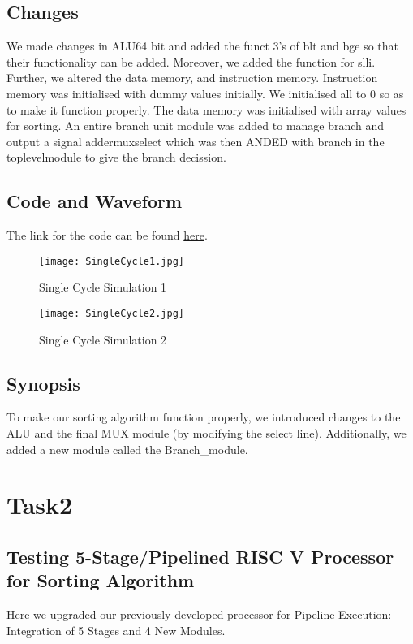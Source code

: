 \documentclass{report}
\begin{document}
\subsection{Changes}
    We made changes in ALU64 bit and added the funct 3's of blt and bge so that their functionality can be added. Moreover, we added the function for slli. Further, we altered the data memory, and instruction memory. Instruction memory was initialised with dummy values initially. We initialised all to 0 so as to make it function properly. The data memory was initialised with array values for sorting. An entire branch unit module was added to manage branch and output a signal addermuxselect which was then ANDED with branch in the toplevelmodule to give the branch decission.
    \pagebreak
\subsection{Code and Waveform}
The link for the code can be found \href{https://github.com/NehalNN10/CA-final-project/blob/main/final_project/final_project.srcs/sources_1/new/RISCV_Processor.v}{here}.
\begin{figure}[h]
    \centerline{\texttt{[image: SingleCycle1.jpg]}}
    \caption{Single Cycle Simulation 1}
\end{figure}

\begin{figure}[h]
    \centerline{\texttt{[image: SingleCycle2.jpg]}}
    \caption{Single Cycle Simulation 2}
\end{figure}

\newpage
\subsection{Synopsis}
    To make our sorting algorithm function properly, we introduced changes to the ALU and the final MUX module (by modifying the select line). Additionally, we added a new module called the Branch\_module.
\newpage
\section{Task2}
\subsection{Testing 5-Stage/Pipelined RISC V Processor for Sorting Algorithm}

Here we upgraded our previously developed processor for Pipeline Execution: Integration of 5 Stages and 4 New Modules.
\end{document}
